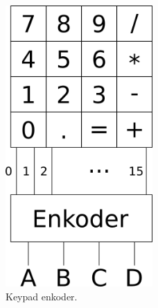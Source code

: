 \begin{figure}[H]
  \caption{Keypad enkoder.}
  \centering
  \includegraphics[width=0.5\textwidth]{./img/kp-enkoder}
\end{figure}
